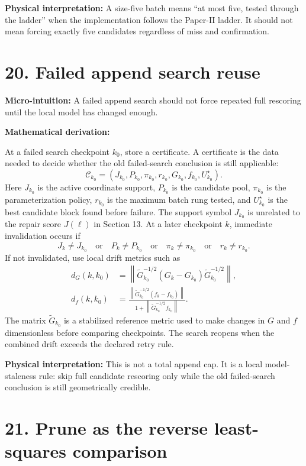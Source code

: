 \documentclass[10pt,twocolumn]{article}
\newcommand{\norm}[1]{\left\lVert #1\right\rVert}
\newcommand{\micro}[1]{%
  \par\smallskip
  \noindent\textcolor{deepblue}{\textbf{Micro-intuition:}} #1
  \par\smallskip}
\newcommand{\deriv}{%
  \par\noindent\textcolor{deepviolet}{\textbf{Mathematical derivation:}}\par\vspace{-1mm}}
\newcommand{\phys}[1]{%
  \par\smallskip
  \noindent\textcolor{deepgreen}{\textbf{Physical interpretation:}} #1
  \par\smallskip}
\begin{document}
\phys{A size-five batch means ``at most five, tested through the ladder''
when the implementation follows the Paper-II ladder. It should not mean forcing
exactly five candidates regardless of miss and confirmation.}

\section*{20. Failed append search reuse}

\micro{A failed append search should not force repeated full rescoring until
the local model has changed enough.}

\deriv
At a failed search checkpoint \(k_0\), store a certificate. A certificate is the
data needed to decide whether the old failed-search conclusion is still
applicable:
\[
\mathcal C_{k_0}
=
(J_{k_0},P_{k_0},\pi_{k_0},r_{k_0},G_{k_0},f_{k_0},U^\star_{k_0}).
\]
Here \(J_{k_0}\) is the active coordinate support, \(P_{k_0}\) is the candidate
pool, \(\pi_{k_0}\) is the parameterization policy, \(r_{k_0}\) is the maximum
batch rung tested, and \(U^\star_{k_0}\) is the best candidate block found
before failure. The support symbol \(J_{k_0}\) is unrelated to the repair score
\(J(\ell)\) in Section 13.
At a later checkpoint \(k\), immediate invalidation occurs if
\[
J_k\ne J_{k_0}
\quad\text{or}\quad
P_k\ne P_{k_0}
\quad\text{or}\quad
\pi_k\ne\pi_{k_0}
\quad\text{or}\quad
r_k\ne r_{k_0}.
\]
If not invalidated, use local drift metrics such as
\[
\begin{aligned}
d_G(k,k_0)
&=\norm{\widetilde G_{k_0}^{-1/2}
(G_k-G_{k_0})
\widetilde G_{k_0}^{-1/2}},\\
d_f(k,k_0)
&=
\frac{\norm{\widetilde G_{k_0}^{-1/2}(f_k-f_{k_0})}}
{1+\norm{\widetilde G_{k_0}^{-1/2}f_{k_0}}}.
\end{aligned}
\]
The matrix \(\widetilde G_{k_0}\) is a stabilized reference metric used to make
changes in \(G\) and \(f\) dimensionless before comparing checkpoints.
The search reopens when the combined drift exceeds the declared retry rule.

\phys{This is not a total append cap. It is a local model-staleness rule:
skip full candidate rescoring only while the old failed-search conclusion is
still geometrically credible.}

\section*{21. Prune as the reverse least-squares comparison}
\end{document}
